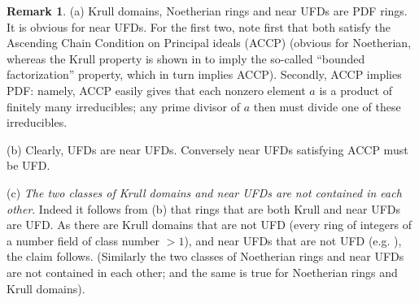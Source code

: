 \documentclass[11pt,a4paper,reqno]{amsart}
\theoremstyle{definition}
\newtheorem{defn}[thm]{Definition}
\newtheorem{rmk}[thm]{Remark}
\begin{document}
 \begin{rmk}\label{rmk:finmanydiv}
(a) Krull domains, Noetherian rings and near UFDs are PDF rings. It is obvious for near UFDs. For the first two, note first that both satisfy the Ascending Chain Condition on Principal ideals (ACCP) (obvious for Noetherian, whereas the Krull property is shown in \cite[Proposition 2.2]{AAZ1990} to imply the so-called ``bounded factorization'' property, which in turn implies ACCP).  Secondly, ACCP implies PDF: namely, ACCP easily gives that each nonzero element $a$ is a product of finitely many irreducibles; any prime divisor of $a$ then must divide one of these irreducibles.

\vskip 1mm

\noindent
(b) Clearly, UFDs are near UFDs. Conversely near UFDs satisfying ACCP must be UFD. 
\vskip 1mm

\noindent
(c) \emph{The two classes of Krull domains and near UFDs are not contained in each other}. Indeed it follows from (b) that rings that are both Krull and near UFDs are UFD. As there are Krull domains that are not UFD (every ring of integers of a number field of class number $>1$), and near UFDs that are not UFD (\hbox{e.g.} \cite[Example 2.4]{BDKN22}), 
the claim follows. (Similarly the two classes of Noetherian rings and near UFDs are not contained in each other; and the same is true for Noetherian rings and Krull domains).
\end{rmk}




\end{document}
